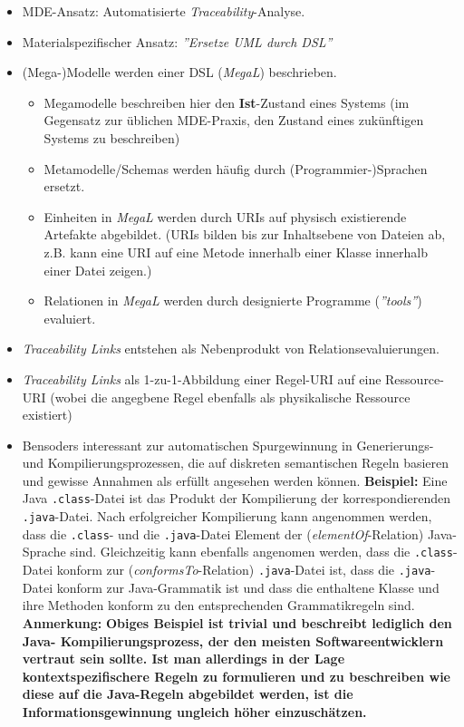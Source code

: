 \begin{itemize}

\item
MDE-Ansatz: Automatisierte \textit{Traceability}-Analyse.

\item
Materialspezifischer Ansatz: \textit{''Ersetze UML durch DSL''}

\item
(Mega-)Modelle werden einer DSL (\textit{MegaL}) beschrieben.
\begin{itemize}
\item
Megamodelle beschreiben hier den \textbf{Ist}-Zustand eines Systems (im Gegensatz zur üblichen MDE-Praxis, den Zustand eines zukünftigen Systems zu beschreiben)
\item
Metamodelle/Schemas werden häufig durch (Programmier-)Sprachen ersetzt.
\item
Einheiten in \textit{MegaL} werden durch URIs auf physisch existierende Artefakte abgebildet. (URIs bilden bis zur Inhaltsebene von Dateien ab, z.B. kann eine URI auf eine Metode innerhalb einer Klasse innerhalb einer Datei zeigen.)

\item
Relationen in \textit{MegaL} werden durch designierte Programme (\textit{''tools''}) evaluiert.
\end{itemize}

\item
\textit{Traceability Links} entstehen als Nebenprodukt von Relationsevaluierungen.

\item
\textit{Traceability Links} als 1-zu-1-Abbildung einer Regel-URI auf eine Ressource-URI (wobei die angegbene Regel ebenfalls als physikalische Ressource existiert)

\item
Bensoders interessant zur automatischen Spurgewinnung in Generierungs- und Kompilierungsprozessen, die auf diskreten semantischen Regeln basieren und gewisse Annahmen als erfüllt angesehen werden können.  
\newline
\textbf{Beispiel:}
Eine Java \texttt{.class}-Datei ist das Produkt der Kompilierung der korrespondierenden \texttt{.java}-Datei. Nach erfolgreicher Kompilierung kann angenommen werden, dass die \texttt{.class}- und die \texttt{.java}-Datei Element der (\textit{elementOf}-Relation) Java-Sprache sind. Gleichzeitig kann ebenfalls angenomen werden, dass die \texttt{.class}-Datei konform zur (\textit{conformsTo}-Relation) \texttt{.java}-Datei ist, dass die \texttt{.java}-Datei konform zur Java-Grammatik ist und dass die enthaltene Klasse und ihre Methoden konform zu den entsprechenden Grammatikregeln sind.  
\newline
\textbf{Anmerkung:}
\textbf{Obiges Beispiel ist trivial und beschreibt lediglich den Java- Kompilierungsprozess, der den meisten Softwareentwicklern vertraut sein sollte. Ist man allerdings in der Lage kontextspezifischere Regeln zu formulieren und zu beschreiben wie diese auf die Java-Regeln abgebildet werden, ist die Informationsgewinnung ungleich höher einzuschätzen.}

\end{itemize}

